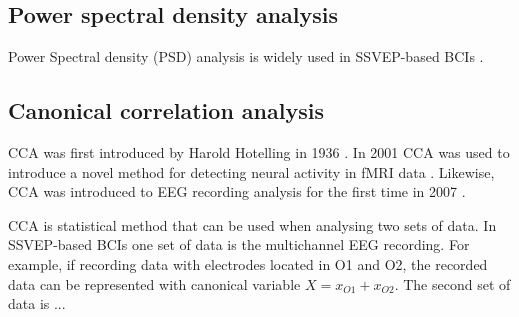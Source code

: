 \subsection{Power spectral density analysis}

Power Spectral density (PSD) analysis is widely used in \gls{SSVEP}-based \glspl{BCI} \cite{bin2009cca}.

\subsection{Canonical correlation analysis}

\Gls{CCA} was first introduced by Harold Hotelling in 1936 \cite{cca_hotelling}. In 2001 \gls{CCA} was used to introduce a novel method for detecting neural activity in \gls{fMRI} data \cite{cca_fmri}. Likewise, \gls{CCA} was introduced to \gls{EEG} recording analysis for the first time in 2007 \cite{cca_lin}. 

\Gls{CCA} is statistical method that can be used when analysing two sets of data. In \gls{SSVEP}-based \glspl{BCI} one set of data is the multichannel \gls{EEG} recording. For example, if recording data with electrodes located in O1 and O2, the recorded data can be represented with canonical variable $X=x_{O1}+x_{O2}$. The second set of data is ...
